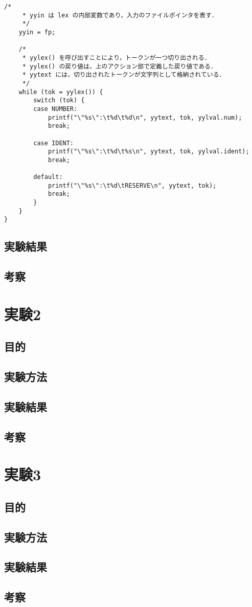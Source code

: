 \documentclass[uplatex]{jsarticle}
\begin{document}
\begin{lstlisting}[caption=scanner.c,label=lst:ex1:scanner.c]
    /*
     * yyin は lex の内部変数であり，入力のファイルポインタを表す．
     */
    yyin = fp;

    /*
     * yylex() を呼び出すことにより，トークンが一つ切り出される．
     * yylex() の戻り値は，上のアクション部で定義した戻り値である．
     * yytext には，切り出されたトークンが文字列として格納されている．
     */
    while (tok = yylex()) {
        switch (tok) {
        case NUMBER:
            printf("\"%s\":\t%d\t%d\n", yytext, tok, yylval.num);
            break;

        case IDENT:
            printf("\"%s\":\t%d\t%s\n", yytext, tok, yylval.ident);
            break;

        default:
            printf("\"%s\":\t%d\tRESERVE\n", yytext, tok);
            break;
        }
    }
}
\end{lstlisting}
\subsection{実験結果}
\subsection{考察}

\section{実験2}
\subsection{目的}
\subsection{実験方法}
\subsection{実験結果}
\subsection{考察}


\section{実験3}
\subsection{目的}
\subsection{実験方法}
\subsection{実験結果}
\subsection{考察}
\end{document}
